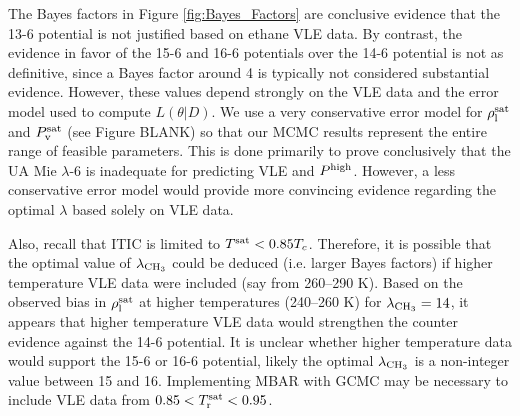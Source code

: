 \documentclass[journal=jctc,manuscript=article]{achemso}
\begin{document}

%

The Bayes factors in Figure \ref{fig:Bayes_Factors} are conclusive evidence that the 13-6 potential is not justified based on ethane VLE data. By contrast, the evidence in favor of the 15-6 and 16-6 potentials over the 14-6 potential is not as definitive, since a Bayes factor around 4 is typically not considered substantial evidence. However, these values depend strongly on the VLE data and the error model used to compute $L(\theta|D)$. We use a very conservative error model for $\rho_{\rm l}^{\rm sat}$ and $P_{\rm v}^{\rm sat}$ (see Figure BLANK) so that our MCMC results represent the entire range of feasible parameters. This is done primarily to prove conclusively that the UA Mie $\lambda$-6 is inadequate for predicting VLE and $P^{\rm high}$. However, a less conservative error model would provide more convincing evidence regarding the optimal $\lambda$ based solely on VLE data. 

Also, recall that ITIC is limited to $T^{\rm sat} < 0.85 T_c$. Therefore, it is possible that the optimal value of $\lambda_{\rm CH_3}$ could be deduced (i.e. larger Bayes factors) if higher temperature VLE data were included (say from 260--290 K). Based on the observed bias in $\rho_{\rm l}^{\rm sat}$ at higher temperatures (240--260 K) for $\lambda_{\rm CH_3} = 14$, it appears that higher temperature VLE data would strengthen the counter evidence against the 14-6 potential. It is unclear whether higher temperature data would support the 15-6 or 16-6 potential, likely the optimal $\lambda_{\rm CH_3}$ is a non-integer value between 15 and 16. 
Implementing MBAR with GCMC may be necessary to include VLE data from $0.85 < T_{\rm r}^{\rm sat} < 0.95$.
\end{document}
